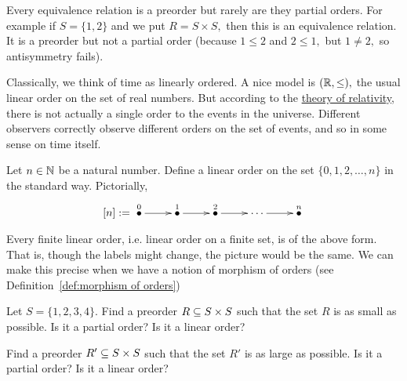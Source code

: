 \documentclass[CT4S-EN-RU]{subfiles}
\begin{document}
\begin{exampleENG}
Every equivalence relation is a preorder but rarely are they partial orders. For example if $S=\{1,2\}$ and we put $R=S\times S,$ then this is an equivalence relation. It is a preorder but not a partial order (because $1\leq 2$ and $2\leq 1,$ but $1\neq 2,$ so antisymmetry fails).
\end{exampleENG}

\begin{exampleRUS}
\end{exampleRUS}

\begin{applicationENG}
Classically, we think of time as linearly ordered. A nice model is $(\RR,\leq),$ the usual linear order on the set of real numbers. But according to the \href{http://en.wikipedia.org/wiki/Relativity_of_simultaneity}{\text theory of relativity}, there is not actually a single order to the events in the universe. Different observers correctly observe different orders on the set of events, and so in some sense on time itself. 
\end{applicationENG}

\begin{applicationRUS}
\end{applicationRUS}

\begin{exampleENG}\label{ex:finite lo}
Let $n\in\NN$ be a natural number. Define a linear order on the set $\{0,1,2,\ldots,n\}$ in the standard way. Pictorially, 
$$
[n]:=\xymatrix{\LMO{0}\ar[r]&\LMO{1}\ar[r]&\LMO{2}\ar[r]&\cdots\ar[r]&\LMO{n}}
$$

Every finite linear order, i.e. linear order on a finite set, is of the above form. That is, though the labels might change, the picture would be the same. We can make this precise when we have a notion of morphism of orders (see Definition~\ref{def:morphism of orders})
\end{exampleENG}

\begin{exampleRUS}\label{ex:finite lo}
\end{exampleRUS}

\begin{exerciseENG}
Let $S=\{1,2,3,4\}.$ 
\sexc Find a preorder $R\ss S\times S$ such that the set $R$ is as small as possible. Is it a partial order? Is it a linear order?
\item Find a preorder $R'\ss S\times S$ such that the set $R'$ is as large as possible. Is it a partial order? Is it a linear order?
\endsexc
\end{exerciseENG}
\end{document}
